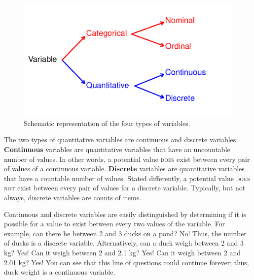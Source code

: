 \documentclass[10pt,openany]{book}\usepackage[]{graphicx}\usepackage[]{color}
\newenvironment{knitrout}{}{} %
\begin{document}
\begin{knitrout}
\color{fgcolor}\begin{figure}[hbtp]

{\centering \includegraphics[width=.5\linewidth]{Figs/VarTypes-1} 

}

\caption[Schematic representation of the four types of variables]{Schematic representation of the four types of variables.}\label{fig:VarTypes}
\end{figure}


\end{knitrout}
\vspace{9pt} %

The two types of quantitative variables are continuous and discrete variables. \textbf{Continuous} variables are quantitative variables that have an uncountable number of values.  In other words, a potential value \textsc{does} exist between every pair of values of a continuous variable. \textbf{Discrete} variables are quantitative variables that have a countable number of values.  Stated differently, a potential value \textsc{does not} exist between every pair of values for a discrete variable. Typically, but not always, discrete variables are counts of items.

Continuous and discrete variables are easily distinguished by determining if it is possible for a value to exist between every two values of the variable. For example, can there be between 2 and 3 ducks on a pond?  No!  Thus, the number of ducks is a discrete variable. Alternatively, can a duck weigh between 2 and 3 kg?  Yes!  Can it weigh between 2 and 2.1 kg?  Yes!  Can it weigh between 2 and 2.01 kg?  Yes!  You can see that this line of questions could continue forever; thus, duck weight is a continuous variable.

\end{document}
